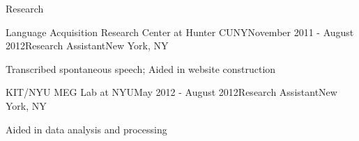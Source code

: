 \documentclass{resume} %
\begin{document}
\begin{rSection}{Research}
\begin{rSubsection}{Language Acquisition Research Center at Hunter CUNY}{November 2011 - August 2012}{Research Assistant}{New York, NY}
\item Transcribed spontaneous speech; Aided in website construction
\end{rSubsection}

\begin{rSubsection}{KIT/NYU MEG Lab at NYU}{May 2012 - August 2012}{Research Assistant}{New York, NY}
\item Aided in data analysis and processing
\end{rSubsection}


\end{rSection}




\end{document}
